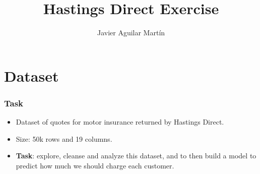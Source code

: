 \documentclass{beamer}
\title{Hastings Direct Exercise}
\author{Javier Aguilar Mart\'in}
\institute{University of Kent}
\date{}
\theoremstyle{definition}
\begin{document}
\frame{\titlepage}


\newcommand{\seti}{\setcounter{saveenumi}{\value{enumi}}}
\newcommand{\conti}{\setcounter{enumi}{\value{saveenumi}}}

\makeatletter
\makeatother

\section{Dataset}

\begin{frame}
\frametitle{Task}
\begin{itemize}
\item<1-> Dataset of quotes for motor insurance returned by Hastings Direct.
\item<2-> Size: 50k rows and 19 columns. 
\item<3-> \textbf{Task}: explore, cleanse and analyze this dataset, and to then build a model to predict how much we should charge each customer.
\end{itemize}
\end{frame}
\end{document}

